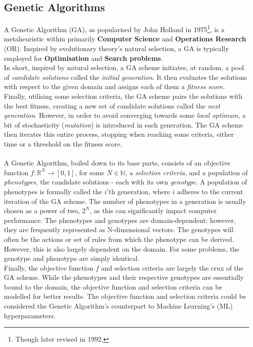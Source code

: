 \subsection{Genetic Algorithms}
A Genetic Algorithm (GA), as popularised by John Holland\cite{Genetic-Algorithm-original} in 1975\footnote{Though later revised in 1992.}, is a metaheuristic within primarily \textbf{Computer Science} and \textbf{Operations Research} (OR). Inspired by evolutionary theory's natural selection, a GA is typically employed for \textbf{Optimisation} and \textbf{Search problems}.
\\
In short, inspired by natural selection, a GA scheme initiates, at random, a pool of \textit{candidate solutions} called the \textit{initial generation}. It then evaluates the solutions with respect to the given domain and assigns each of them a \textit{fitness score}. Finally, utilising some selection criteria, the GA scheme pairs the solutions with the best fitness, creating a new set of candidate solutions called the \textit{next generation}. However, in order to avoid converging towards some \textit{local optimum}, a bit of stochasticity (\textit{mutation}) is introduced in each generation. The GA scheme then iterates this entire process, stopping when reaching some criteria, either time or a threshold on the fitness score.
\\
\\
A Genetic Algorithm, boiled down to its base parts, consists of an objective function $f : \mathbb{R}^N \rightarrow [0,1]$, for some $N \in \mathbb{N}$, a \textit{selection criteria}, and a population of \textit{phenotypes}, the candidate solutions - each with its own \textit{genotype}. A population of phenotypes is formally called the $i$'th generation, where $i$ adheres to the current iteration of the GA scheme. The number of phenotypes in a generation is usually chosen as a power of two, $2^N$, as this can significantly impact computer performance. The phenotypes and genotypes are domain-dependent; however, they are frequently represented as N-dimensional vectors. The genotypes will often be the actions or set of rules from which the phenotype can be derived. However, this is also largely dependent on the domain. For some problems, the genotype and phenotype are simply identical.
\\
Finally, the objective function $f$ and selection criteria are largely the crux of the GA scheme. While the phenotypes and their respective genotypes are essentially bound to the domain, the objective function and selection criteria can be modelled for better results. The objective function and selection criteria could be considered the Genetic Algorithm's counterpart to Machine Learning's (ML) hyperparameters.
